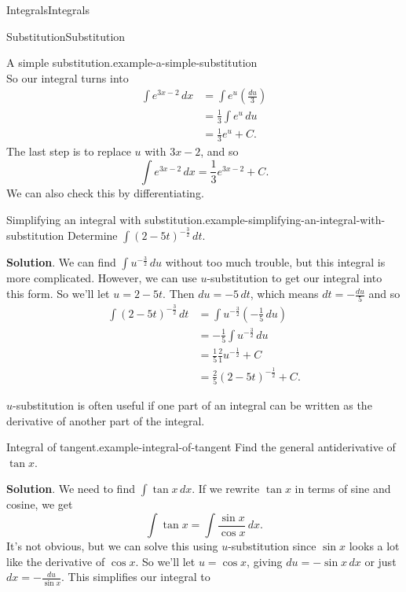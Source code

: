 \documentclass[10pt,]{book}
\numberwithin{equation}{section}
\begin{document}
\begin{chapterptx}{Integrals}{}{Integrals}{}{}
\begin{sectionptx}{Substitution}{}{Substitution}{}{}
\begin{example}{A simple substitution.}{example-a-simple-substitution}
\begin{equation*}
\end{equation*}
So our integral turns into%
\begin{align*}
\int e^{3x-2}\,dx & = \int e^{u}\left(\frac{du}{3}\right) \\
& = \frac{1}{3}\int e^{u}\,du \\
& = \frac{1}{3}e^{u} + C. 
\end{align*}
The last step is to replace \(u\) with \(3x-2\), and so%
\begin{equation*}
\int e^{3x-2}\,dx = \frac{1}{3}e^{3x-2} + C.
\end{equation*}
We can also check this by differentiating.%
\end{example}
\begin{example}{Simplifying an integral with substitution.}{example-simplifying-an-integral-with-substitution}%
\hypertarget{p-483}{}%
Determine \(\int(2 - 5t)^{-\frac{3}{2}}\,dt\).%
\par\smallskip%
\noindent\textbf{Solution}.\hypertarget{solution-106}{}\quad%
\hypertarget{p-484}{}%
We can find \(\int u^{-\frac{3}{2}}\,du\) without too much trouble, but this integral is more complicated. However, we can use \(u\)-substitution to get our integral into this form. So we'll let \(u = 2 - 5t\). Then \(du = -5\,dt\), which means \(dt = -\frac{du}{5}\) and so%
\begin{align*}
\int(2-5t)^{-\frac{3}{2}}\,dt & = \int u^{-\frac{3}{2}}\left(-\frac{1}{5}\,du\right) \\
& = -\frac{1}{5}\int u^{-\frac{3}{2}}\,du \\
& = \frac{1}{5}\frac{2}{1}u^{-\frac{1}{2}} + C \\
& = \frac{2}{5}(2 - 5t)^{-\frac{1}{2}} + C. 
\end{align*}
%
\end{example}
\hypertarget{p-485}{}%
\(u\)-substitution is often useful if one part of an integral can be written as the derivative of another part of the integral.%
\begin{example}{Integral of tangent.}{example-integral-of-tangent}%
\hypertarget{p-486}{}%
Find the general antiderivative of \(\tan x\).%
\par\smallskip%
\noindent\textbf{Solution}.\hypertarget{solution-107}{}\quad%
\hypertarget{p-487}{}%
We need to find \(\int\tan x\,dx\). If we rewrite \(\tan x\) in terms of sine and cosine, we get%
\begin{equation*}
\int\tan x = \int\frac{\sin x}{\cos x}\,dx.
\end{equation*}
It's not obvious, but we can solve this using \(u\)-substitution since \(\sin x\) looks a lot like the derivative of \(\cos x\). So we'll let \(u = \cos x\), giving \(du = -\sin x\,dx\) or just \(dx = -\frac{du}{\sin x}\). This simplifies our integral to%

\end{example}
\end{sectionptx}
\end{chapterptx}
\end{document}
